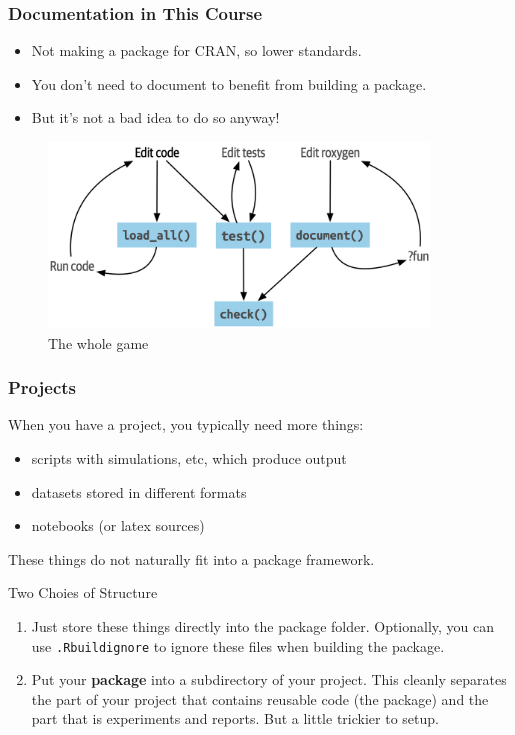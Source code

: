 \documentclass[aspectratio=1610,onlytextwidth]{beamer}
\begin{document}
\begin{frame}[c]
  \frametitle{Documentation in This Course}

  \begin{itemize}
    \item Not making a package for CRAN, so lower standards.
    \item You don't need to document to benefit from building a package.
    \item But it's not a bad idea to do so anyway!
  \end{itemize}
\end{frame}

\begin{frame}[c]
  \begin{figure}[htpb]
    \centering
    \includegraphics[width=0.9\textwidth]{images/pkgs-workflow.png}
    \caption{%
      The whole game
    }
  \end{figure}
\end{frame}

\begin{frame}[c]
  \frametitle{Projects}

  When you have a project, you typically need more things:
  \begin{itemize}
    \item scripts with simulations, etc, which produce output
    \item datasets stored in different formats
    \item notebooks (or latex sources)
  \end{itemize}

  These things do not naturally fit into a package framework.

  \pause

  \begin{block}{Two Choies of Structure}
    \begin{enumerate}[<+->]
      \item Just store these things directly into the package folder. Optionally, you can use \texttt{.Rbuildignore}
            to ignore these files when building the package.
      \item Put your \textbf{package} into a \alert{subdirectory} of your project. This cleanly separates
            the part of your project that contains reusable code (the package) and the
            part that is experiments and reports. But a little trickier to setup.
    \end{enumerate}

  \end{block}

\end{frame}
\end{document}

